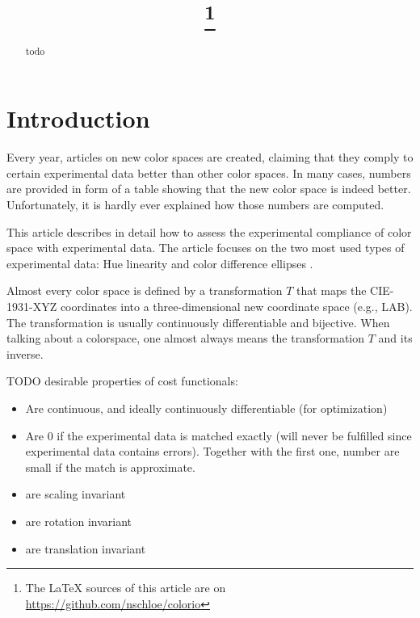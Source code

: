 \documentclass{scrartcl}
\title{\mytitle\footnote{The LaTeX sources of this article are on
\url{https://github.com/nschloe/colorio}}}
\author{\myauthor}
\theoremstyle{named}
\begin{document}
\maketitle
\begin{abstract}
  todo
\end{abstract}

\section{Introduction}

Every year, articles on new color spaces are created, claiming that they comply to
certain experimental data better than other color spaces. In many cases, numbers are
provided in form of a table showing that the new color space is indeed better.
Unfortunately, it is hardly ever explained how those numbers are computed.

This article describes in detail how to assess the experimental compliance of color
space with experimental data. The article focuses on the two most used types of
experimental data: Hue linearity \cite{ebner,xiao,hung} and color difference ellipses
\cite{macadam1942,luorigg}.

Almost every color space is defined by a transformation $T$ that maps the CIE-1931-XYZ
coordinates into a three-dimensional new coordinate space (e.g., LAB). The
transformation is usually continuously differentiable and bijective. When talking about
a colorspace, one almost always means the transformation $T$ and its inverse.


TODO desirable properties of cost functionals:
\begin{itemize}
  \item Are continuous, and ideally continuously differentiable (for optimization)
  \item Are 0 if the experimental data is matched exactly (will never be fulfilled since
    experimental data contains errors). Together with the first one, number are small if
    the match is approximate.
  \item are scaling invariant
  \item are rotation invariant
  \item are translation invariant
\end{itemize}
\end{document}
